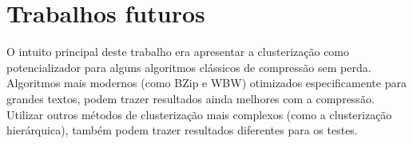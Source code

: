 \section{Trabalhos futuros}
O intuito principal deste trabalho era apresentar a clusterização como potencializador para alguns algoritmos clássicos de compressão sem perda.
Algoritmos mais modernos (como BZip e WBW) otimizados especificamente para grandes textos, podem trazer resultados ainda melhores com a compressão.
Utilizar outros métodos de clusterização mais complexos (como a clusterização hierárquica), também podem trazer resultados diferentes para os testes.




